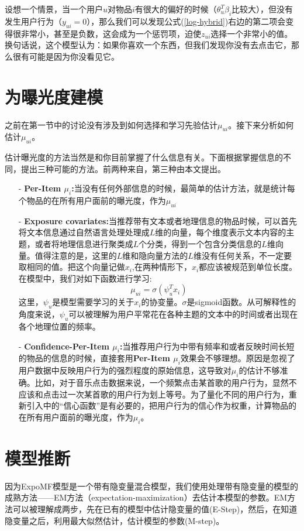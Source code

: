 \documentclass[notitlepage,cs4size,punct,oneside]{ctexrep}
\numberwithin{equation}{chapter}
\theoremstyle{mystyle}
\begin{document}
\par
设想一个情景，当一个用户$u$对物品$i$有很大的偏好的时候（$\theta_u^T\beta_i$比较大），但没有发生用户行为（$y_{ui}=0$），那么我们可以发现公式(\ref{log-hybrid})右边的第二项会变得很非常小，甚至是负数，这会成为一个惩罚项，迫使$z_{ui}$选择一个非常小的值。换句话说，这个模型认为：如果你喜欢一个东西，但我们发现你没有去点击它，那么很有可能是因为你没看见它。

\section{为曝光度建模}

之前在第一节中的讨论没有涉及到如何选择和学习先验估计$\mu_{ui}$。接下来分析如何估计$\mu_{ui}$。
\par
估计曝光度的方法当然是和你目前掌握了什么信息有关。下面根据掌握信息的不同，提出三种可能的方法。前两种来自\cite{EXPOMF}，第三种由本文提出。


\begin{itemize}
\item[-] \textbf{Per-Item $\mu_i$:}当没有任何外部信息的时候，最简单的估计方法，就是统计每个物品的在所有用户面前的曝光度，作为$\mu_{ui}$
\item[-] \textbf{Exposure covariates:}当推荐带有文本或者地理信息的物品时候，可以首先将文本信息通过自然语言处理处理成$L$维的向量，每个维度表示文本内容的主题，或者将地理信息进行聚类成$L$个分类，得到一个包含分类信息的$L$维向量。值得注意的是，这里的$L$维和隐向量方法的$L$维没有任何关系，不一定要取相同的值。把这个向量记做$x_i$,在两种情形下，$x_i$都应该被规范到单位长度。在模型中，我们对如下函数进行学习:$$\mu_{ui}=\sigma(\psi_u^Tx_i)$$这里，$\psi_u$是模型需要学习的关于$x_i$的协变量。$\sigma$是sigmoid函数。从可解释性的角度来说，$\psi_u$可以被理解为用户平常花在各种主题的文本中的时间或者出现在各个地理位置的频率。
\item[-] \textbf{Confidence-Per-Item $\mu_i$:}当推荐用户行为中带有频率和或者反映时间长短的物品的信息的时候，直接套用\textbf{Per-Item $\mu_i$}效果会不够理想。原因是忽视了用户数据中反映用户行为的强烈程度的原始信息，这导致对$\mu_{i}$的估计不够准确。比如，对于音乐点击数据来说，一个频繁点击某首歌的用户行为，显然不应该和点击过一次某首歌的用户行为划上等号。为了量化不同的用户行为，重新引入\cite{WMF}中的“信心函数”是有必要的，把用户行为的信心作为权重，计算物品的在所有用户面前的曝光度，作为$\mu_i$。

\end{itemize}

\section{模型推断}
因为ExpoMF模型是一个带有隐变量混合模型，我们使用处理带有隐变量的模型的成熟方法——EM方法（expectation-maximization）去估计本模型的参数。EM方法可以被理解成两步，先在已有的模型中估计隐变量的值(E-Step)，然后，在知道隐变量之后，利用最大似然估计，估计模型的参数(M-step)。
\end{document}
